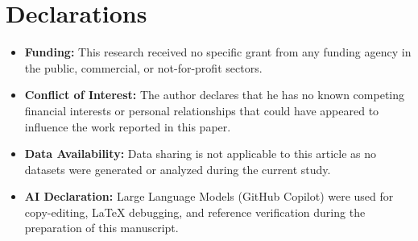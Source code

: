 \section*{Declarations}
\begin{itemize}
    \item \textbf{Funding:} This research received no specific grant from any funding agency in the public, commercial, or not-for-profit sectors.
    \item \textbf{Conflict of Interest:} The author declares that he has no known competing financial interests or personal relationships that could have appeared to influence the work reported in this paper.
    \item \textbf{Data Availability:} Data sharing is not applicable to this article as no datasets were generated or analyzed during the current study.
    \item \textbf{AI Declaration:} Large Language Models (GitHub Copilot) were used for copy-editing, LaTeX debugging, and reference verification during the preparation of this manuscript.
\end{itemize}

